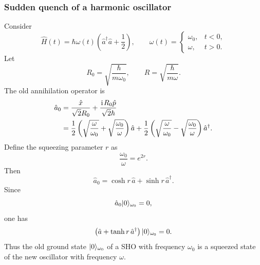 \subsubsection{Sudden quench of a harmonic oscillator}
Consider
\begin{equation}
\hat H(t)=\hbar\omega(t)
\left(\hat a^\dagger\hat a+\frac12\right),
\qquad
\omega(t)=
\begin{cases}
\omega_0,&t<0,\\
\omega,&t>0.
\end{cases}
\end{equation}
Let
\begin{equation}
R_0=\sqrt{\frac{\hbar}{m\omega_0}},
\qquad
R=\sqrt{\frac{\hbar}{m\omega}}.
\end{equation}
The old annihilation operator is
\begin{align}
\hat a_0
&=\frac{\hat x}{\sqrt2R_0}
+\frac{\hspace{1pt}\mathrm{i}\hspace{1pt} R_0\hat p}{\sqrt2\hbar}\nonumber\\
&=\frac12\left(\sqrt{\frac{\omega}{\omega_0}}
+\sqrt{\frac{\omega_0}{\omega}}\right)\hat a
+\frac12\left(\sqrt{\frac{\omega}{\omega_0}}
-\sqrt{\frac{\omega_0}{\omega}}\right)\hat a^\dagger.
\end{align}
Define the squeezing parameter $r$ as 
\begin{equation}
\frac{\omega_0}{\omega}=e^{2r}.
\end{equation}
Then
\begin{equation}
\hat a_0=\cosh r\,\hat a+\sinh r\,\hat a^\dagger.
\end{equation}
Since
\begin{equation}
\hat a_0|{0}\rangle_{\omega_0}=0,
\end{equation}
one has
\begin{equation}
\left(\hat a+\tanh r\,\hat a^\dagger\right)
|{0}\rangle_{\omega_0}=0.
\end{equation}
Thus the old ground state $|{0}\rangle_{\omega_0}$ of a SHO with frequency $\omega_0$ is a squeezed state of the new oscillator with frequency $\omega$.

